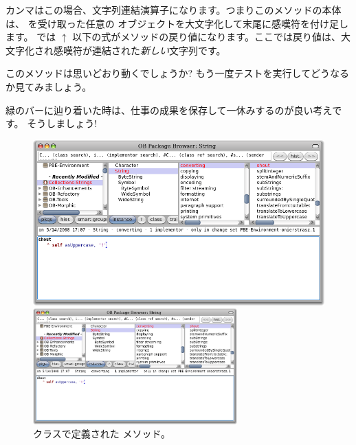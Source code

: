 \documentclass[a4paper,10pt,twoside]{book}
\begin{document}
カンマはこの場合、文字列連結演算子になります。つまりこのメソッドの本体は、 を受け取った任意の  オブジェクトを大文字化して末尾に感嘆符を付け足します。
\pharo では $\uparrow$ 以下の式がメソッドの戻り値になります。ここでは戻り値は、大文字化され感嘆符が連結された\emph{新しい}文字列です。

このメソッドは思いどおり動くでしょうか? もう一度テストを実行してどうなるか見てみましょう。

緑のバーに辿り着いた時は、仕事の成果を保存して一休みするのが良い考えです。
そうしましょう!

\begin{figure}[hbt]
\ifluluelse
	{\centerline{\includegraphics[width=\textwidth]{String-Shout}}}
	{\centerline{\includegraphics[width=0.7\textwidth]{String-Shout}}}
\caption{ クラスで定義された  メソッド。
}
\end{figure}
\end{document}
